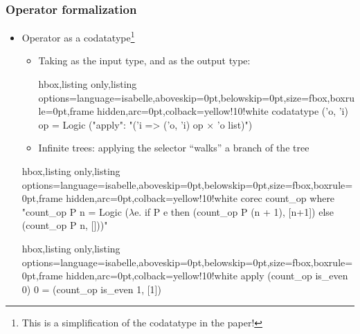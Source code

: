 \documentclass[aspectratio=169,10pt]{beamer}
\begin{document}
\begin{frame}[fragile]
  \frametitle{Operator formalization}
  \begin{itemize}
    \item Operator as a codatatype\footnote{This is a simplification of the codatatype in the paper!}

          \begin{itemize}
            \item Taking  as the input type, and  as the output type:
                  \vspace*{-1.5ex}
                  \begin{tcblisting}{hbox,listing only,listing options={language=isabelle,aboveskip=0pt,belowskip=0pt},size=fbox,boxrule=0pt,frame hidden,arc=0pt,colback=yellow!10!white}
codatatype ('o, 'i) op = Logic ("apply": "('i => ('o, 'i) op $\times$ 'o list)")
                  \end{tcblisting}

                  \vspace*{-1.5ex}
                  \pause
            \item Infinite trees: applying the selector  ``walks'' a branch of the tree
          \end{itemize}
\begin{tcblisting}{hbox,listing only,listing options={language=isabelle,aboveskip=0pt,belowskip=0pt},size=fbox,boxrule=0pt,frame hidden,arc=0pt,colback=yellow!10!white}
corec count_op where "count_op P n =
  Logic ($\lambda$e. if P e then (count_op P (n + 1), [n+1]) else (count_op P n, []))"
\end{tcblisting}

\begin{tcblisting}{hbox,listing only,listing options={language=isabelle,aboveskip=0pt,belowskip=0pt},size=fbox,boxrule=0pt,frame hidden,arc=0pt,colback=yellow!10!white}
apply (count_op is_even 0) 0 = (count_op is_even 1, [1])
\end{tcblisting}
  \end{itemize}
\end{frame}
\end{document}
